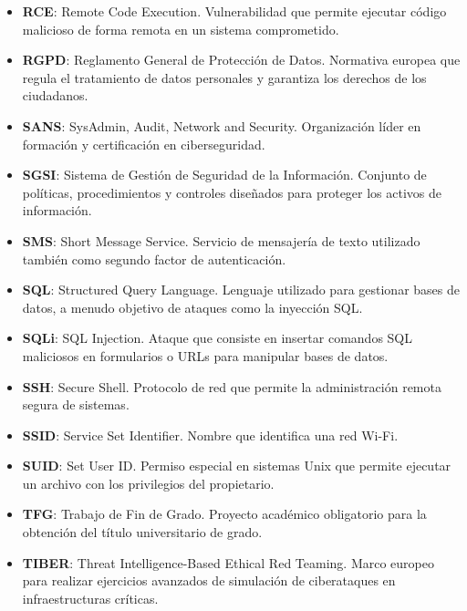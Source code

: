 \documentclass[a4paper, 11pt]{article}
\begin{document}
\begin{itemize}
    \item \textbf{RCE}: Remote Code Execution. Vulnerabilidad que permite ejecutar código malicioso de forma remota en un sistema comprometido.

    \item \textbf{RGPD}: Reglamento General de Protección de Datos. Normativa europea que regula el tratamiento de datos personales y garantiza los derechos de los ciudadanos.

    \item \textbf{SANS}: SysAdmin, Audit, Network and Security. Organización líder en formación y certificación en ciberseguridad.

    \item \textbf{SGSI}: Sistema de Gestión de Seguridad de la Información. Conjunto de políticas, procedimientos y controles diseñados para proteger los activos de información.

    \item \textbf{SMS}: Short Message Service. Servicio de mensajería de texto utilizado también como segundo factor de autenticación.

    \item \textbf{SQL}: Structured Query Language. Lenguaje utilizado para gestionar bases de datos, a menudo objetivo de ataques como la inyección SQL.

    \item \textbf{SQLi}: SQL Injection. Ataque que consiste en insertar comandos SQL maliciosos en formularios o URLs para manipular bases de datos.

    \item \textbf{SSH}: Secure Shell. Protocolo de red que permite la administración remota segura de sistemas.

    \item \textbf{SSID}: Service Set Identifier. Nombre que identifica una red Wi-Fi.

    \item \textbf{SUID}: Set User ID. Permiso especial en sistemas Unix que permite ejecutar un archivo con los privilegios del propietario.

    \item \textbf{TFG}: Trabajo de Fin de Grado. Proyecto académico obligatorio para la obtención del título universitario de grado.

    \item \textbf{TIBER}: Threat Intelligence-Based Ethical Red Teaming. Marco europeo para realizar ejercicios avanzados de simulación de ciberataques en infraestructuras críticas.


\end{itemize}
\end{document}
